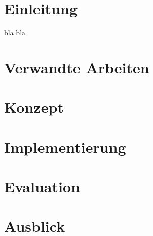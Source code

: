 \chapter{Einleitung}

bla \cite{Breslin2009} bla

\chapter{Verwandte Arbeiten}
\chapter{Konzept}
\chapter{Implementierung}
\chapter{Evaluation}
\chapter{Ausblick}